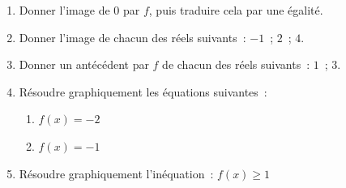 \documentclass[12pt,a4paper]{article}
\begin{document}
\begin{enumerate}
  \item Donner l'image de $0$ par $f$, puis traduire cela par une égalité.
  \item Donner l'image de chacun des réels suivants~: $-1$~; $2$~; $4$.
  \item Donner un antécédent par $f$ de chacun des réels suivants~: $1$~; $3$.
  \item Résoudre graphiquement les équations suivantes~:
  \begin{enumerate}[label=\alph*.]
    \item $f(x) = -2$
    \item $f(x) = -1$
  \end{enumerate}
  \item Résoudre graphiquement l'inéquation~: $f(x) \geqslant 1$
\end{enumerate}
\end{document}
